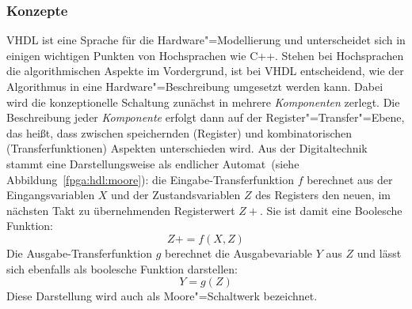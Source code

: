 \subsubsection{Konzepte}

VHDL ist eine Sprache für die Hardware"=Modellierung und unterscheidet sich in
einigen wichtigen Punkten von Hochsprachen wie C++. Stehen bei Hochsprachen
die algorithmischen Aspekte im Vordergrund, ist bei VHDL entscheidend, wie der
Algorithmus in eine Hardware"=Beschreibung umgesetzt werden kann. Dabei wird die
konzeptionelle Schaltung zunächst in mehrere \textit{Komponenten} zerlegt. Die
Beschreibung jeder \textit{Komponente} erfolgt dann auf der
Register"=Transfer"=Ebene, das heißt, dass zwischen speichernden (Register) und
kombinatorischen (Transferfunktionen) Aspekten unterschieden wird. Aus der
Digitaltechnik stammt eine Darstellungsweise als \glqq endlicher Automat\grqq\
(siehe Abbildung~\ref{fpga:hdl:moore}): die Eingabe-Transferfunktion $f$ berechnet
aus der Eingangsvariablen $X$ und der Zustandsvariablen $Z$ des Registers den
neuen, im nächsten Takt zu übernehmenden Registerwert $Z+$. Sie ist damit eine
Boolesche Funktion:
%
\[
    Z+ = f(X, Z)
\]
%
Die Ausgabe-Transferfunktion $g$ berechnet die Ausgabevariable $Y$ aus $Z$ und lässt
sich ebenfalls als boolesche Funktion darstellen:
%
\[
    Y = g(Z)
\]
%
Diese Darstellung wird auch als Moore"=Schaltwerk bezeichnet.
\cite[vgl.][34--35]{kesel2013}
%
